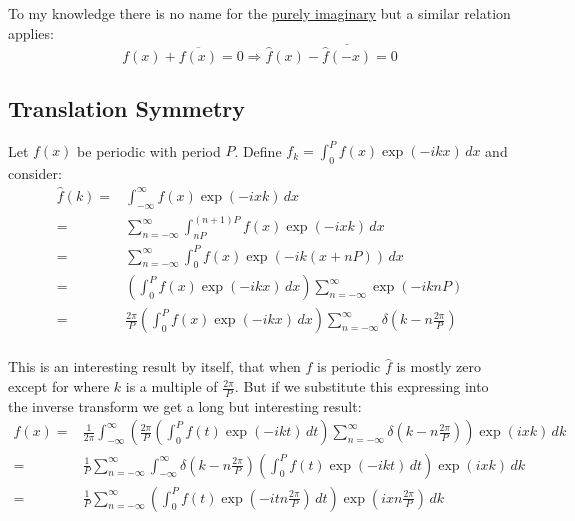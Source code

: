 To my knowledge there is no name for the \hyperref[appx:real-img-odd-even]{purely imaginary} but a similar relation applies:
\[f(x) + \overline{f(x)} = 0 \Rightarrow \hat{f}(x)-\overline{\hat{f}(-x)} = 0\]

\subsection{Translation Symmetry}
Let $f(x)$ be periodic with period $P$.
Define $f_k = \int_{0}^{P}f(x)\exp(-ikx)\,dx$ and consider:
\begin{equation*}
\begin{aligned}
	\hat{f}(k) =& \int_{-\infty}^{\infty}f(x)\exp(-ixk)\,dx \\
	=& \sum_{n=-\infty}^{\infty}\int_{nP}^{(n+1)P}f(x)\exp(-ixk)\,dx \\
	=& \sum_{n=-\infty}^{\infty}\int_{0}^{P}f(x)\exp(-ik(x+nP))\,dx \\
	=& \left(\int_{0}^{P}f(x)\exp(-ikx)\,dx\right)\sum_{n=-\infty}^{\infty}\exp(-iknP) \\
	=& \frac{2\pi}{P}\left(\int_{0}^{P}f(x)\exp(-ikx)\,dx\right)\sum_{n=-\infty}^{\infty}\delta\left(k-n\frac{2\pi}{P}\right)\\
\end{aligned}
\end{equation*}

This is an interesting result by itself, that when $f$ is periodic $\hat{f}$ is mostly zero except for where $k$ is a multiple of $\frac{2\pi}{P}$.
But if we substitute this expressing into the inverse transform we get a long but interesting result:
\begin{equation*}
\begin{aligned}
	f(x) =& \frac{1}{2\pi}\int_{-\infty}^{\infty}\left(\frac{2\pi}{P}\left(\int_{0}^{P}f(t)\exp(-ikt)\,dt\right)\sum_{n=-\infty}^{\infty}\delta\left(k-n\frac{2\pi}{P}\right)\right)\exp(ixk)\,dk\\
	      =&\frac{1}{P}\sum_{n=-\infty}^{\infty}\int_{-\infty}^{\infty}\delta\left(k-n\frac{2\pi}{P}\right)\left(\int_{0}^{P}f(t)\exp(-ikt)\,dt\right)\exp(ixk)\,dk \\
	      =&\frac{1}{P}\sum_{n=-\infty}^{\infty}\left(\int_{0}^{P}f(t)\exp(-itn\frac{2\pi}{P})\,dt\right)\exp\left(ixn\frac{2\pi}{P}\right)\,dk
\end{aligned}
\end{equation*}

